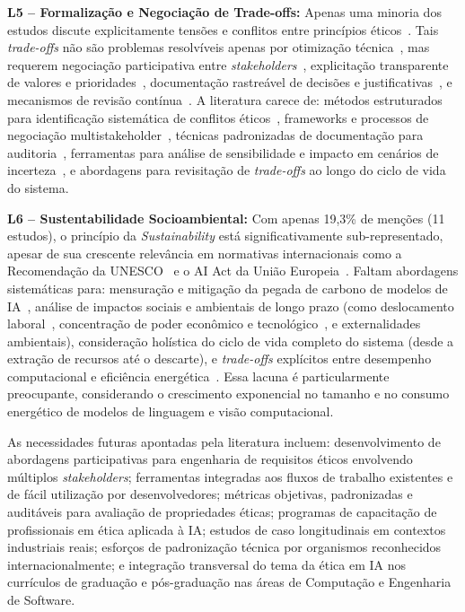 \textbf{L5 -- Formalização e Negociação de Trade-offs:} Apenas uma minoria dos estudos discute explicitamente tensões e conflitos entre princípios éticos~\cite{Selbst2019, Green2019}. Tais \textit{trade-offs} não são problemas resolvíveis apenas por otimização técnica~\cite{Kleinberg2017}, mas requerem negociação participativa entre \textit{stakeholders}~\cite{Shilton2013}, explicitação transparente de valores e prioridades~\cite{Friedman2013}, documentação rastreável de decisões e justificativas~\cite{Mitchell2019}, e mecanismos de revisão contínua~\cite{Raji2020}. A literatura carece de: métodos estruturados para identificação sistemática de conflitos éticos~\cite{CorbettDavies2018}, frameworks e processos de negociação multistakeholder~\cite{Nathan2007}, técnicas padronizadas de documentação para auditoria~\cite{Arnold2019}, ferramentas para análise de sensibilidade e impacto em cenários de incerteza~\cite{Binns2020}, e abordagens para revisitação de \textit{trade-offs} ao longo do ciclo de vida do sistema.

\textbf{L6 -- Sustentabilidade Socioambiental:} Com apenas 19,3\% de menções (11 estudos), o princípio da \textit{Sustainability} está significativamente sub-representado, apesar de sua crescente relevância em normativas internacionais como a Recomendação da UNESCO~\cite{UNESCO2021} e o AI Act da União Europeia~\cite{EUAIAct2024}. Faltam abordagens sistemáticas para: mensuração e mitigação da pegada de carbono de modelos de IA~\cite{Strubell2019, Patterson2021}, análise de impactos sociais e ambientais de longo prazo (como deslocamento laboral~\cite{Crawford2021}, concentração de poder econômico e tecnológico~\cite{Whittaker2021}, e externalidades ambientais), consideração holística do ciclo de vida completo do sistema (desde a extração de recursos até o descarte), e \textit{trade-offs} explícitos entre desempenho computacional e eficiência energética~\cite{Schwartz2020, Bender2021}. Essa lacuna é particularmente preocupante, considerando o crescimento exponencial no tamanho e no consumo energético de modelos de linguagem e visão computacional.

As necessidades futuras apontadas pela literatura incluem: desenvolvimento de abordagens participativas para engenharia de requisitos éticos envolvendo múltiplos \textit{stakeholders}; ferramentas integradas aos fluxos de trabalho existentes e de fácil utilização por desenvolvedores; métricas objetivas, padronizadas e auditáveis para avaliação de propriedades éticas; programas de capacitação de profissionais em ética aplicada à IA; estudos de caso longitudinais em contextos industriais reais; esforços de padronização técnica por organismos reconhecidos internacionalmente; e integração transversal do tema da ética em IA nos currículos de graduação e pós-graduação nas áreas de Computação e Engenharia de Software.

